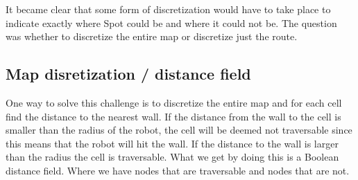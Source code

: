 It became clear that some form of discretization would have to take place to indicate exactly where Spot could be and where it could not be.
The question was whether to discretize the entire map or discretize just the route.





\subsection{Map disretization / distance field}
One way to solve this challenge is to discretize the entire map and for each cell find the distance to the nearest wall. If the distance from the wall to the cell is smaller than the radius of the robot, the cell will be deemed not traversable since this means that the robot will hit the wall. If the distance to the wall is larger than the radius the cell is traversable. What we get by doing this is a Boolean distance field. Where we have nodes that are traversable and nodes that are not.

